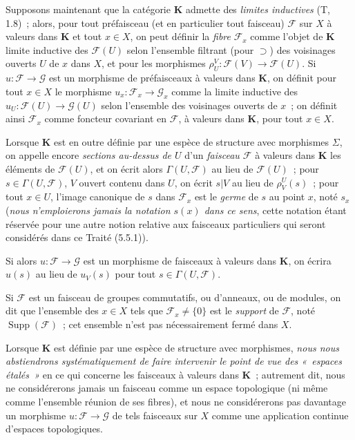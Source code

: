 \begin{env}[3.1.6]
\label{0.3.1.6-fr}
Supposons maintenant que la catégorie $\mathbf{K}$ admette des \emph{limites
inductives} (T, 1.8)~; alors, pour tout préfaisceau (et en particulier tout
faisceau) $\mathcal{F}$ sur $X$ à valeurs dans $\mathbf{K}$ et tout $x\in X$,
on peut définir la \emph{fibre} $\mathcal{F}_x$ comme l'objet de $\mathbf{K}$
limite inductive des $\mathcal{F}(U)$ selon l'ensemble filtrant (pour
$\supset$) des voisinages ouverts $U$ de $x$ dans $X$, et pour les morphismes
$\rho_U^V:\mathcal{F}(V)\to\mathcal{F}(U)$. Si
$u:\mathcal{F}\to\mathcal{G}$ est un morphisme de préfaisceaux à valeurs dans
$\mathbf{K}$, on définit pour tout $x\in X$ le morphisme
$u_x:\mathcal{F}_x\to\mathcal{G}_x$ comme la limite inductive des
$u_U:\mathcal{F}(U)\to\mathcal{G}(U)$ selon l'ensemble des voisinages ouverts
de $x$~; on définit ainsi $\mathcal{F}_x$ comme foncteur covariant en
$\mathcal{F}$, à valeurs dans $\mathbf{K}$, pour tout $x\in X$.

Lorsque $\mathbf{K}$ est en outre définie par une espèce de structure avec
morphismes $\Sigma$, on appelle encore \emph{sections au-dessus de $U$} d'un
\emph{faisceau $\mathcal{F}$} à valeurs dans $\mathbf{K}$ les éléments de
$\mathcal{F}(U)$, et on écrit alors $\Gamma(U,\mathcal{F})$ au lieu de
$\mathcal{F}(U)$~; pour $s\in\Gamma(U,\mathcal{F})$, $V$ ouvert contenu dans
$U$, on écrit $s|V$ au lieu de $\rho_V^U(s)$~; pour tout $x\in U$, l'image
canonique de $s$ dans $\mathcal{F}_x$ est le \emph{germe} de $s$ au point $x$,
noté $s_x$ (\emph{nous n'emploierons jamais la notation $s(x)$ dans ce sens},
cette notation étant réservée pour une autre notion relative aux faisceaux
particuliers qui seront considérés dans ce Traité (5.5.1)).

Si alors $u:\mathcal{F}\to\mathcal{G}$ est un morphisme de faisceaux à valeurs
dans $\mathbf{K}$, on écrira $u(s)$ au lieu de $u_V(s)$ pour tout
$s\in\Gamma(U,\mathcal{F})$.

Si $\mathcal{F}$ est un faisceau de groupes commutatifs, ou d'anneaux, ou de
modules, on dit que l'ensemble des $x\in X$ tels que
$\mathcal{F}_x\neq\{0\}$ est le \emph{support} de $\mathcal{F}$, noté
$\operatorname{Supp}(\mathcal{F})$~; cet ensemble n'est pas nécessairement
fermé dans $X$.

Lorsque $\mathbf{K}$ est définie par une espèce de structure avec morphismes,
\emph{nous nous abstiendrons systématiquement de faire intervenir le point de
vue des «~espaces étalés~»} en ce qui concerne les faisceaux à valeurs dans
$\mathbf{K}$~; autrement dit, nous ne considérerons jamais un faisceau comme
un espace topologique (ni même comme l'ensemble réunion de ses fibres), et
nous ne considérerons pas davantage un morphisme
$u:\mathcal{F}\to\mathcal{G}$ de tels faisceaux sur $X$ comme une application
continue d'espaces topologiques.
\end{env}

